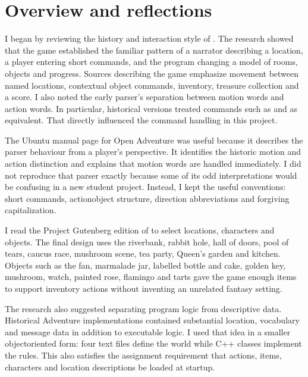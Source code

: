 \documentclass[letterpaper,10pt,english]{sphinxmanual}
\begin{document}
\section{Overview and reflections}
\label{\detokenize{AssignmentFour/main:overview-and-reflections}}
\sphinxAtStartPar
I began by reviewing the history and interaction style of . The research showed that the game established the familiar pattern
of a narrator describing a location, a player entering short commands, and the
program changing a model of rooms, objects and progress. Sources describing the
game emphasize movement between named locations, contextual object commands,
inventory, treasure collection and a score. I also noted the early parser’s
separation between motion words and action words. In particular, historical
versions treated commands such as  and  as equivalent.
That directly influenced the command handling in this project.

\sphinxAtStartPar
The Ubuntu manual page for Open Adventure was useful because it describes the
parser behaviour from a player’s perspective. It identifies the historic
motion and action distinction and explains that motion words are handled
immediately. I did not reproduce that parser exactly because some of its odd
interpretations would be confusing in a new student project. Instead, I kept
the useful conventions: short commands, action\sphinxhyphen{}object structure, direction
abbreviations and forgiving capitalization.

\sphinxAtStartPar
I read the Project Gutenberg edition of  to
select locations, characters and objects. The final design uses the riverbank,
rabbit hole, hall of doors, pool of tears, caucus race, mushroom scene, tea
party, Queen’s garden and kitchen. Objects such as the fan, marmalade jar,
labelled bottle and cake, golden key, mushroom, watch, painted rose, flamingo and
tarts gave the game enough items to support inventory actions without inventing
an unrelated fantasy setting.

\sphinxAtStartPar
The research also suggested separating program logic from descriptive data.
Historical Adventure implementations contained substantial location,
vocabulary and message data in addition to executable logic. I used that idea
in a smaller object\sphinxhyphen{}oriented form: four text files define the world while C++
classes implement the rules. This also satisfies the assignment requirement
that actions, items, characters and location descriptions be loaded at startup.
\end{document}

